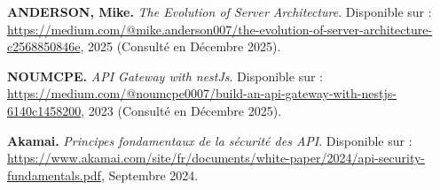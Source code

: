 \begin{enumerate}[label={[W\arabic*]}]
    \item \textbf{ANDERSON, Mike.} \textit{The Evolution of Server Architecture}. Disponible sur : \url{https://medium.com/@mike.anderson007/the-evolution-of-server-architecture-c2568850846e}, 2025 (Consulté en Décembre 2025).
    \item \textbf{NOUMCPE.} \textit{API Gateway with nestJs}. Disponible sur : \url{https://medium.com/@noumcpe0007/build-an-api-gateway-with-nestjs-6140c1458200}, 2023 (Consulté en Décembre 2025).
    \item \textbf{Akamai.} \textit{Principes fondamentaux de la sécurité des API}. Disponible sur : \url{https://www.akamai.com/site/fr/documents/white-paper/2024/api-security-fundamentals.pdf}, Septembre 2024.
\end{enumerate}
